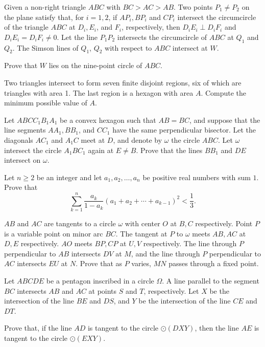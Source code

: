 \documentclass[11pt]{scrartcl}
\begin{document}
\begin{problem}[8895719454292056765]
Given a non-right triangle $ABC$ with $BC>AC>AB$. Two points $P_1 \neq P_2$ on the plane satisfy that, for $i=1,2$, if $AP_i, BP_i$ and $CP_i$ intersect the circumcircle of the triangle $ABC$ at $D_i, E_i$, and $F_i$, respectively, then $D_iE_i \perp D_iF_i$ and $D_iE_i = D_iF_i \neq 0$. Let the line $P_1P_2$ intersects the circumcircle of $ABC$ at $Q_1$ and $Q_2$. The Simson lines of $Q_1$, $Q_2$ with respect to $ABC$ intersect at $W$.

Prove that $W$ lies on the nine-point circle of $ABC$.
\end{problem}
\begin{problem}[1580707630770476037]
Two triangles intersect to form seven finite disjoint regions, six of which are triangles with area 1. The last region is a hexagon with area \(A\). Compute the minimum possible value of \(A\).
\end{problem}
\begin{problem}[876239022447910]
	Let $ABCC_1B_1A_1$ be a convex hexagon such that $AB=BC$, and suppose that the line segments $AA_1, BB_1$, and $CC_1$ have the same perpendicular bisector. Let the diagonals $AC_1$ and $A_1C$ meet at $D$, and denote by $\omega$ the circle $ABC$. Let $\omega$ intersect the circle $A_1BC_1$ again at $E \neq B$. Prove that the lines $BB_1$ and $DE$ intersect on $\omega$.
\end{problem}
\begin{problem}[723258861624579]
Let $n\geq 2$ be an integer and let $a_1, a_2, \ldots, a_n$ be positive real numbers with sum $1$. Prove that$$\sum_{k=1}^n \frac{a_k}{1-a_k}(a_1+a_2+\cdots+a_{k-1})^2 < \frac{1}{3}.$$
\end{problem}
\begin{problem}[733773583946080]
$AB$ and $AC$ are tangents to a circle $\omega$ with center $O$ at $B,C$ respectively. Point $P$ is a variable point on minor arc $BC$. The tangent at $P$ to $\omega$ meets $AB,AC$ at $D,E$ respectively. $AO$ meets $BP,CP$ at $U,V$ respectively. The line through $P$ perpendicular to $AB$ intersects $DV$ at $M$, and the line through $P$ perpendicular to $AC$ intersects $EU$ at $N$. Prove that as $P$ varies, $MN$ passes through a fixed point.
\end{problem}
\begin{problem}[5867489266334805897]
	Let $ABCDE$ be a pentagon inscribed in a circle $\Omega$. A line parallel to the segment $BC$ intersects $AB$ and $AC$ at points $S$ and $T$, respectively. Let $X$ be the intersection of the line $BE$ and $DS$, and $Y$ be the intersection of the line $CE$ and $DT$.

Prove that, if the line $AD$ is tangent to the circle $\odot(DXY)$, then the line $AE$ is tangent to the circle $\odot(EXY)$.
\end{problem}
\end{document}
